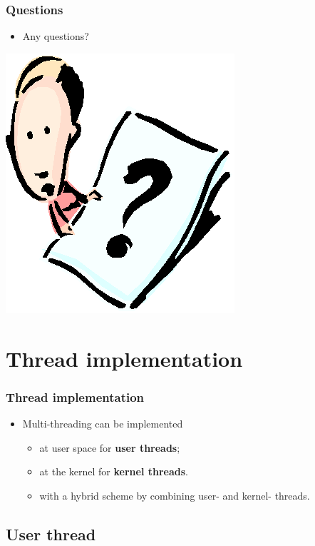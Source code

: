 \documentclass[CJKutf8,xcolor=pdftex,dvipsnames,table]{beamer}
\begin{document}
\begin{CJK*}{UTF8}{song}
  \begin{frame}
  \frametitle{Questions}
  \begin{itemize}
  \item{Any questions?}
  \end{itemize}
  \begin{center}
    \includegraphics[scale=.5]{question}
  \end{center}
  \end{frame}

  \section{Thread implementation}

  \begin{frame}
  \frametitle{Thread implementation} \pause
  \begin{itemize}
  \item{Multi-threading can be implemented} \pause
    \begin{itemize}
    \item{at user space for \textbf{user threads};} \pause
    \item{at the kernel for \textbf{kernel threads}.} \pause
    \item{with a hybrid scheme by combining user- and kernel- threads.}
    \end{itemize}
  \end{itemize}
  \end{frame}

  \subsection{User thread}


\end{CJK*}
\end{document}
